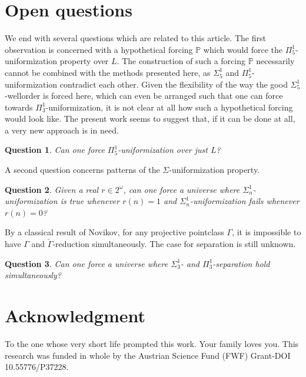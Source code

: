 \documentclass[a4paper,11pt]{article}
\newtheorem{question}{Question}
\newcommand{\forceP}{\mathbb{P}}
\begin{document}
    \section{Open questions}

    We end with several questions which are related to this article.
    The first observation is concerned with a hypothetical forcing $\forceP$ which would force the $\Pi^1_5$-uniformization property over $L$.
    The construction of such a forcing $\forceP$ necessarily cannot be combined with the methods presented here, as $\Sigma^1_5$ and $\Pi^1_5$-uniformization contradict each other. Given the flexibility of the way the good $\Sigma^1_5$-wellorder is forced here, which can even be arranged such that one can force towards $\Pi^1_3$-uniformization, it is not clear at all how such a hypothetical forcing would look like. The present work seems to suggest that, if it can be done at all, a very new approach is in need.
    \begin{question}
   Can one force $\Pi^1_5$-uniformization over just $L$?
    \end{question}
    A second question concerns patterns of the $\Sigma$-uniformization property. 
        \begin{question}
    Given a real $r \in 2^{\omega}$, can one force a universe where $\Sigma^1_n$-uniformization is true whenever $r(n)=1$ and $\Sigma^1_n$-uniformization fails whenever $r(n)=0$?
    \end{question}
  
    By a classical result of Novikov, for any projective pointclass $\Gamma$, it is impossible to have $\Gamma$ and $\check{\Gamma}$-reduction simultaneously. The case  for separation is still unknown.
    
    \begin{question}
    
    Can one force a universe where $\Sigma^1_3$- and $\Pi^1_3$-separation hold simultaneously?
    
    \end{question}
    
    \section{Acknowledgment}
 
 To the one whose very short life prompted this work. Your family loves you.
 This research was funded in whole by the Austrian Science Fund (FWF) Grant-DOI 10.55776/P37228.
    
\end{document}

